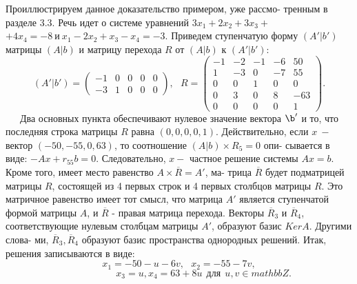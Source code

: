 \documentclass{mai_book}
\begin{document}
	Проиллюстрируем данное доказательство примером, уже рассмо-\linebreak
	тренным в разделе 3.3. Речь идет о системе уравнений $3x_1 + 2x_2 + 3x_3 +$\linebreak
	$+ 4x_4 = -8\ \text{и} \ x_1 - 2x_2 + x_3 - x_4 = -3$. Приведем ступенчатую форму\linebreak
	$(A' | b')$ матрицы $(A | b)$ и матрицу перехода $R$ от $(A | b)$ к $(A' | b')$:
	$$(A' | b') = \begin{pmatrix} -1 & 0 & 0 & 0 & 0 \\ -3 & 1 & 0 & 0 & 0 \end{pmatrix},\ \ \  R = \begin{pmatrix} -1 & -2 & -1 & -6 & 50 \\ 1 & -3 & 0 & -7 & 55 \\ 0 & 0 & 1 & 0 & 0 \\ 0 & 3 & 0 & 8 & -63 \\ 0 & 0 & 0 & 0 & 1 \end{pmatrix}.$$
	\ \ \ Два основных пункта обеспечивают нулевое значение вектора $\b'$ и\linebreak
	то, что последняя строка матрицы $R$ равна $(0, 0, 0, 0, 1)$. Действительно,\linebreak
	если $x \ -$ вектор $(-50, -55, 0, 63)$, то соотношение $(A | b)\times R_5 = 0$ опи-\linebreak
	сывается в виде: $-Ax + r_{55}b = 0$. Следовательно, $x - $ частное решение\linebreak
	системы $Ax = b$. Кроме того, имеет место равенство $A\times\overline{R} = A'$, ма-\linebreak
	трица $\overline{R}$ будет подматрицей матрицы $R$, состоящей из 4 первых строк\linebreak
	и 4 первых столбцов матрицы $R$. Это матричное равенство имеет тот\linebreak
	смысл, что матрица $A'$ является ступенчатой формой матрицы $A$, и\linebreak
	$\overline{R}$ - правая матрица перехода. Векторы $\overline{R}_3$ и $\overline{R}_4$, соответствующие\linebreak
	нулевым столбцам матрицы $A'$, образуют базис $KerA$. Другими слова-\linebreak
	ми, $\overline{R}_3, \overline{R}_4$ образуют базис пространства однородных решений. Итак,\linebreak
	решения записываются в виде:
	$$x_1 = -50 - u - 6v, \ \ \ x_2 = -55 - 7v,$$
	$$ \ \ \ \ \ \ \ \ \ \ \ \ \ \ \ \ \ \ \ \ \ \ \ x_3 = u, x_4 = 63 + 8u \ \ \text{для} \ \ u, v \in mathbb Z.$$
	
\end{document}
